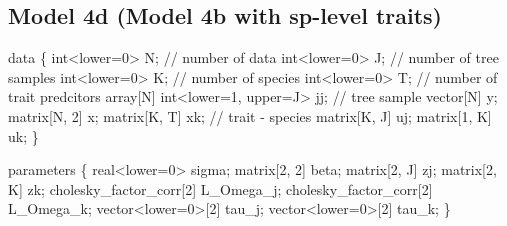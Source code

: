 \documentclass[
  12pt,
  letterpaper,
  DIV=11,
  numbers=noendperiod]{scrartcl}
\newenvironment{Shaded}{\begin{snugshade}}{\end{snugshade}}
\newcommand{\CommentTok}[1]{\textcolor[rgb]{0.37,0.37,0.37}{#1}}
\newcommand{\DataTypeTok}[1]{\textcolor[rgb]{0.68,0.00,0.00}{#1}}
\newcommand{\DecValTok}[1]{\textcolor[rgb]{0.68,0.00,0.00}{#1}}
\newcommand{\KeywordTok}[1]{\textcolor[rgb]{0.00,0.23,0.31}{#1}}
\newcommand{\NormalTok}[1]{\textcolor[rgb]{0.00,0.23,0.31}{#1}}
\begin{document}
\newpage

\subsection{Model 4d (Model 4b with sp-level
traits)}\label{model-4d-model-4b-with-sp-level-traits}

\begin{Shaded}
\begin{Highlighting}[]
\KeywordTok{data}\NormalTok{ \{}
  \DataTypeTok{int}\NormalTok{\textless{}}\KeywordTok{lower}\NormalTok{=}\DecValTok{0}\NormalTok{\textgreater{} N; }\CommentTok{// number of data}
  \DataTypeTok{int}\NormalTok{\textless{}}\KeywordTok{lower}\NormalTok{=}\DecValTok{0}\NormalTok{\textgreater{} J; }\CommentTok{// number of tree samples}
  \DataTypeTok{int}\NormalTok{\textless{}}\KeywordTok{lower}\NormalTok{=}\DecValTok{0}\NormalTok{\textgreater{} K; }\CommentTok{// number of species}
  \DataTypeTok{int}\NormalTok{\textless{}}\KeywordTok{lower}\NormalTok{=}\DecValTok{0}\NormalTok{\textgreater{} T; }\CommentTok{// number of trait predcitors}
  \DataTypeTok{array}\NormalTok{[N] }\DataTypeTok{int}\NormalTok{\textless{}}\KeywordTok{lower}\NormalTok{=}\DecValTok{1}\NormalTok{, }\KeywordTok{upper}\NormalTok{=J\textgreater{} jj; }\CommentTok{// tree sample}
  \DataTypeTok{vector}\NormalTok{[N] y;}
  \DataTypeTok{matrix}\NormalTok{[N, }\DecValTok{2}\NormalTok{] x;}
  \DataTypeTok{matrix}\NormalTok{[K, T] xk; }\CommentTok{// trait {-} species}
  \DataTypeTok{matrix}\NormalTok{[K, J] uj;}
  \DataTypeTok{matrix}\NormalTok{[}\DecValTok{1}\NormalTok{, K] uk;}
\NormalTok{\}}

\KeywordTok{parameters}\NormalTok{ \{}
  \DataTypeTok{real}\NormalTok{\textless{}}\KeywordTok{lower}\NormalTok{=}\DecValTok{0}\NormalTok{\textgreater{} sigma;}
  \DataTypeTok{matrix}\NormalTok{[}\DecValTok{2}\NormalTok{, }\DecValTok{2}\NormalTok{] beta;}
  \DataTypeTok{matrix}\NormalTok{[}\DecValTok{2}\NormalTok{, J] zj;}
  \DataTypeTok{matrix}\NormalTok{[}\DecValTok{2}\NormalTok{, K] zk;}
  \DataTypeTok{cholesky\_factor\_corr}\NormalTok{[}\DecValTok{2}\NormalTok{] L\_Omega\_j;}
  \DataTypeTok{cholesky\_factor\_corr}\NormalTok{[}\DecValTok{2}\NormalTok{] L\_Omega\_k;}
  \DataTypeTok{vector}\NormalTok{\textless{}}\KeywordTok{lower}\NormalTok{=}\DecValTok{0}\NormalTok{\textgreater{}[}\DecValTok{2}\NormalTok{] tau\_j;}
  \DataTypeTok{vector}\NormalTok{\textless{}}\KeywordTok{lower}\NormalTok{=}\DecValTok{0}\NormalTok{\textgreater{}[}\DecValTok{2}\NormalTok{] tau\_k;}
\NormalTok{\}}


\end{Highlighting}
\end{Shaded}
\end{document}
